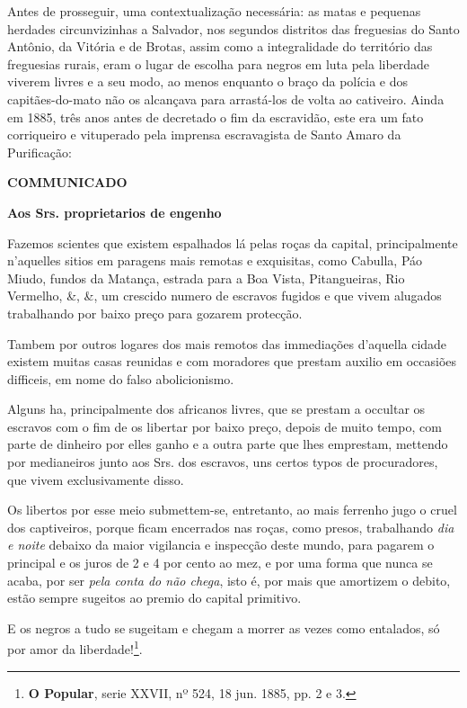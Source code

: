 Antes de prosseguir, uma contextualização necessária: as matas e pequenas herdades circunvizinhas a Salvador, nos segundos distritos das freguesias do Santo Antônio, da Vitória e de Brotas, assim como a integralidade do território das freguesias rurais, eram o lugar de escolha para negros em luta pela liberdade viverem livres e a seu modo, ao menos enquanto o braço da polícia e dos capitães-do-mato não os alcançava para arrastá-los de volta ao cativeiro. Ainda em 1885, três anos antes de decretado o fim da escravidão, este era um fato corriqueiro e vituperado pela imprensa escravagista de Santo Amaro da Purificação:

\begin{citacao}
\textbf{COMMUNICADO}

\textbf{Aos Srs. proprietarios de engenho}

Fazemos scientes que existem espalhados lá pelas roças da capital, principalmente n'aquelles sitios em paragens mais remotas e exquisitas, como Cabulla, Páo Miudo, fundos da Matança, estrada para a Boa Vista, Pitangueiras, Rio Vermelho, \&, \&, um crescido numero de escravos fugidos e que vivem alugados trabalhando por baixo preço para gozarem protecção.

Tambem por outros logares dos mais remotos das immediações d'aquella cidade existem muitas casas reunidas e com moradores que prestam auxilio em occasiões difficeis, em nome do falso abolicionismo.

Alguns ha, principalmente dos africanos livres, que se prestam a occultar os escravos com o fim de os libertar por baixo preço, depois de muito tempo, com parte de dinheiro por elles ganho e a outra parte que lhes emprestam, mettendo por medianeiros junto aos Srs. dos escravos, uns certos typos de procuradores, que vivem exclusivamente disso.

Os libertos por esse meio submettem-se, entretanto, ao mais ferrenho jugo o cruel dos captiveiros, porque ficam encerrados nas roças, como presos, trabalhando \textit{dia e noite} debaixo da maior vigilancia e inspecção deste mundo, para pagarem o principal e os juros de 2 e 4 por cento ao mez, e por uma forma que nunca se acaba, por ser \textit{pela conta do não chega}, isto é, por mais que amortizem o debito, estão sempre sugeitos ao premio do capital primitivo.

E os negros a tudo se sugeitam e chegam a morrer as vezes como entalados, só por amor da liberdade!\footnote{\textbf{O Popular}, serie XXVII, nº 524, 18 jun. 1885, pp. 2 e 3.}.
\end{citacao}

